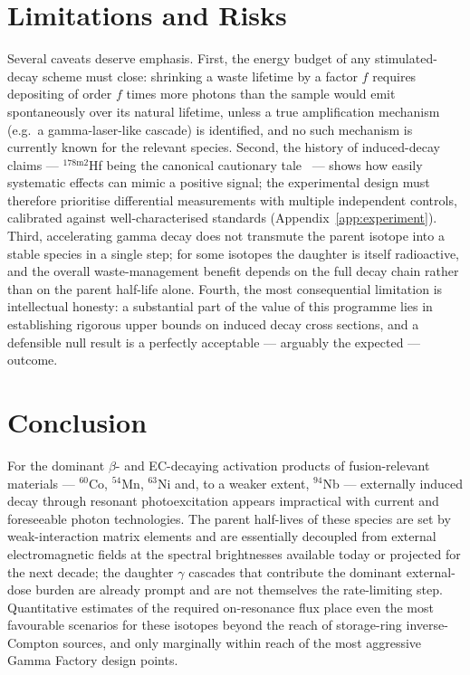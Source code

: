 \documentclass[conference]{IEEEtran}
\begin{document}
\section{Limitations and Risks}
\label{sec:limits}
Several caveats deserve emphasis. First, the energy budget of any stimulated-decay scheme must close: shrinking a waste lifetime by a factor $f$ requires depositing of order $f$ times more photons than the sample would emit spontaneously over its natural lifetime, unless a true amplification mechanism (e.g.\ a gamma-laser-like cascade) is identified, and no such mechanism is currently known for the relevant species. Second, the history of induced-decay claims --- $^{178\mathrm{m}2}$Hf being the canonical cautionary tale~\cite{collins1999hafnium,ahmad2003hafnium} --- shows how easily systematic effects can mimic a positive signal; the experimental design must therefore prioritise differential measurements with multiple independent controls, calibrated against well-characterised standards (Appendix~\ref{app:experiment}). Third, accelerating gamma decay does not transmute the parent isotope into a stable species in a single step; for some isotopes the daughter is itself radioactive, and the overall waste-management benefit depends on the full decay chain rather than on the parent half-life alone. Fourth, the most consequential limitation is intellectual honesty: a substantial part of the value of this programme lies in establishing rigorous upper bounds on induced decay cross sections, and a defensible null result is a perfectly acceptable --- arguably the expected --- outcome.

\section{Conclusion}
\label{sec:concl}
For the dominant $\beta$- and EC-decaying activation products of fusion-relevant materials --- $^{60}$Co, $^{54}$Mn, $^{63}$Ni and, to a weaker extent, $^{94}$Nb --- externally induced decay through resonant photoexcitation appears impractical with current and foreseeable photon technologies. The parent half-lives of these species are set by weak-interaction matrix elements and are essentially decoupled from external electromagnetic fields at the spectral brightnesses available today or projected for the next decade; the daughter $\gamma$ cascades that contribute the dominant external-dose burden are already prompt and are not themselves the rate-limiting step. Quantitative estimates of the required on-resonance flux place even the most favourable scenarios for these isotopes beyond the reach of storage-ring inverse-Compton sources, and only marginally within reach of the most aggressive Gamma Factory design points.
\end{document}
